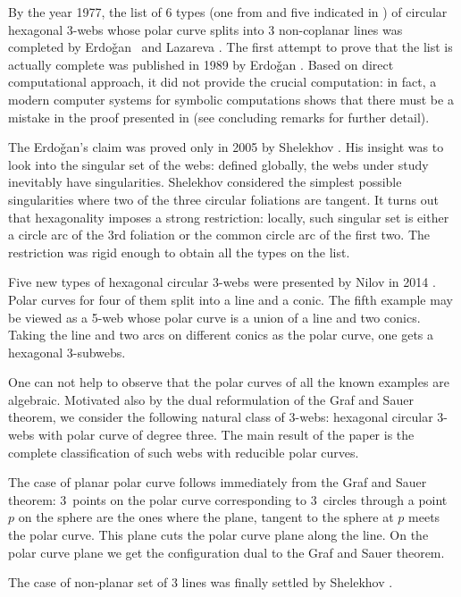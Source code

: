 \documentclass[pdftex]{sigma}
\numberwithin{equation}{section}
\begin{document}
By the year 1977, the list of 6 types (one from \cite{BB-38} and five indicated in \cite{W-38}) of circular hexagonal 3-webs whose polar curve splits into 3 non-coplanar lines was completed by Erdo\v{g}an~\cite{E-74} and Lazareva \cite{L-77}. The first attempt to prove that the list is actually complete was published in 1989 by Erdo\v{g}an \cite{E-89}. Based on direct computational approach, it did not provide the crucial computation: in fact, a modern computer systems for symbolic computations shows that there must be a mistake in the proof presented in \cite{E-89} (see concluding remarks for further detail).

The Erdo\v{g}an's claim was proved only in 2005 by Shelekhov \cite{S-05}. His insight was to look into the singular set of the webs: defined globally, the webs under study inevitably have singularities. Shelekhov considered the simplest possible singularities where two of the three circular foliations are tangent. It turns out that hexagonality imposes a strong restriction: locally, such singular set is either a circle arc of the 3rd foliation or the common circle arc of the first two. The restriction was rigid enough to obtain all the types on the list.

Five new types of hexagonal circular 3-webs were presented by Nilov in 2014 \cite{N-14}. Polar curves for four of them split into a line and a conic. The fifth example may be viewed as a 5-web whose polar curve is a union of a line and two conics. Taking the line and two arcs on different conics as the polar curve, one gets a hexagonal 3-subwebs.

One can not help to observe that the polar curves of all the known examples are algebraic. Motivated also by the dual reformulation of the Graf and Sauer theorem, we consider the following natural class of 3-webs: hexagonal circular 3-webs with polar curve of degree three. The main result of the paper is the complete classification of such webs with reducible polar curves.

The case of planar polar curve follows immediately from the Graf and Sauer theorem: 3~points on the polar curve corresponding to 3~circles through a point~$p$ on the sphere are the ones where the plane, tangent to the sphere at $p$ meets the polar curve. This plane cuts the polar curve plane along the line. On the polar curve plane we get the configuration dual to the Graf and Sauer theorem.

The case of non-planar set of 3 lines was finally settled by Shelekhov \cite{S-05}.
\end{document}
